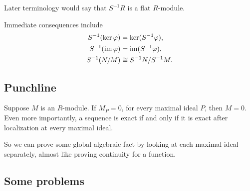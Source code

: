 \documentclass[11pt]{article}
\begin{document}
Later terminology would say that 
$S^{-1}R$ is a flat $R$-module. 

Immediate consequences include 
\begin{align*}
    S^{-1}(\ker\varphi) &= \ker(S^{-1}\varphi), \\ 
    S^{-1}(\operatorname{im}\varphi) &= \operatorname{im}(S^{-1}\varphi), \\ 
    S^{-1}(N/M) &\cong S^{-1}N/S^{-1}M. 
\end{align*}

\subsection{Punchline}

Suppose $M$ is an $R$-module. 
If $M_P = 0$, for every maximal ideal $P$, then 
$M = 0$. 
Even more importantly, a sequence is exact if and only if 
it is exact after localization at every 
maximal ideal. 

So we can prove some global algebraic fact by looking 
at each maximal ideal separately, almost like proving 
continuity for a function. 


\subsection{Some problems}
\end{document}
